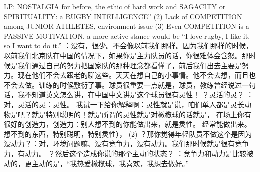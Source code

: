 \begin{CJK}{UTF8}{gbsn}
              LP: NOSTALGIA for before, the ethic of hard work and SAGACITY or SPIRITUALITY: a RUGBY INTELLIGENCE” (2) Lack of COMPETITION among JUNIOR ATHLETES, environment issue (3) Even COMPETITION is a PASSIVE MOTIVATION, a more active stance would be “I love rugby, I like it, so I want to do it.”	：没有，很少。不会像以前我们那样。因为我们那样的时候，以前我们北京队在中国的情况下，如果你是主力队员的话，你很难体会含怒。那时候是我们通过自己的努力把国家队的那种理念都看懂了，前后我们出去主要是努力。现在他们不会去跟老的聊这些。天天在想自己的小事情。他不会去想，而且也不会去做。训练的时候敷衍了事。球员很重要一点就是，球员，教练曾经说过一句话，我不知道英文怎么讲，在中国中文讲是这个球员很有灵性！
              ？灵活的灵？
              ：对，灵活的灵：灵性。 我试一下给你解释啊：灵性就是说，咱们单人都是灵长动物是吧？就是特别聪明的！就是所谓的灵性就是对橄榄球的话就是， 在场上你有很好的创造力，创造力：别人想不到的你能做出来，就是灵性。 经常能做出来。 想不到的东西，特别聪明，特别灵性），
              (2) ？那你觉得年轻队员不做这个是因为没动力？：对，环境问题嘛、没有竞争力，没有动力。我们那时候就是很有竞争力，有动力。
              ？然后这个造成你说的那个主动的状态？
              ：竞争力和动力是比较被动的，更主动的是，“我热爱橄榄球，我喜欢，我想去做好。”





\end{CJK}
